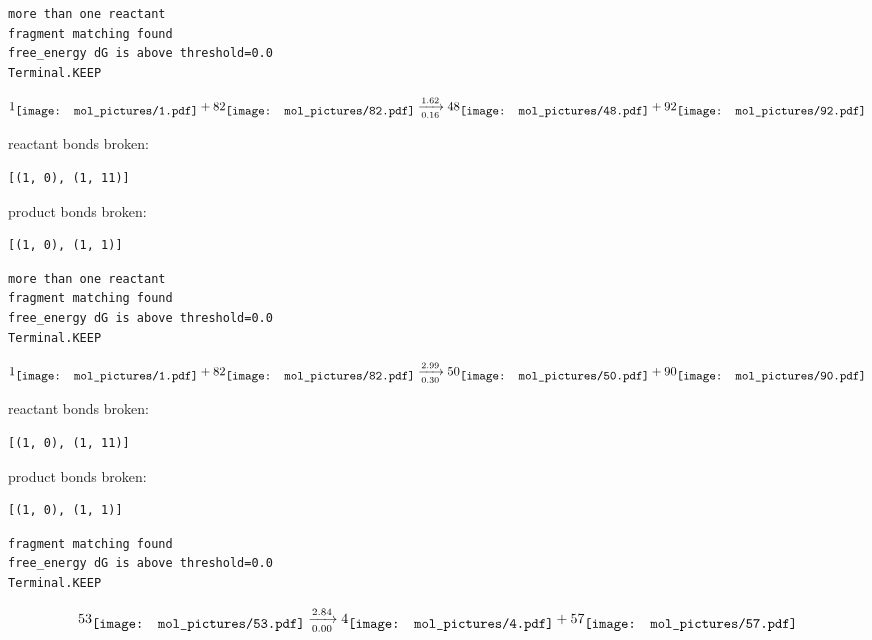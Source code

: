 \documentclass{article}
\begin{document}
\vspace{1cm}
\begin{verbatim}
more than one reactant
fragment matching found
free_energy dG is above threshold=0.0
Terminal.KEEP
\end{verbatim}
$$
1
\raisebox{-.5\height}{\texttt{[image: mol\_pictures/1.pdf]}}
+
82
\raisebox{-.5\height}{\texttt{[image: mol\_pictures/82.pdf]}}
\xrightarrow[0.16]{1.62}
48
\raisebox{-.5\height}{\texttt{[image: mol\_pictures/48.pdf]}}
+
92
\raisebox{-.5\height}{\texttt{[image: mol\_pictures/92.pdf]}}
$$


reactant bonds broken:\begin{verbatim}
[(1, 0), (1, 11)]
\end{verbatim}
product bonds broken:\begin{verbatim}
[(1, 0), (1, 1)]
\end{verbatim}




\vspace{1cm}
\begin{verbatim}
more than one reactant
fragment matching found
free_energy dG is above threshold=0.0
Terminal.KEEP
\end{verbatim}
$$
1
\raisebox{-.5\height}{\texttt{[image: mol\_pictures/1.pdf]}}
+
82
\raisebox{-.5\height}{\texttt{[image: mol\_pictures/82.pdf]}}
\xrightarrow[0.30]{2.99}
50
\raisebox{-.5\height}{\texttt{[image: mol\_pictures/50.pdf]}}
+
90
\raisebox{-.5\height}{\texttt{[image: mol\_pictures/90.pdf]}}
$$


reactant bonds broken:\begin{verbatim}
[(1, 0), (1, 11)]
\end{verbatim}
product bonds broken:\begin{verbatim}
[(1, 0), (1, 1)]
\end{verbatim}




\vspace{1cm}
\begin{verbatim}
fragment matching found
free_energy dG is above threshold=0.0
Terminal.KEEP
\end{verbatim}
$$
53
\raisebox{-.5\height}{\texttt{[image: mol\_pictures/53.pdf]}}
\xrightarrow[0.00]{2.84}
4
\raisebox{-.5\height}{\texttt{[image: mol\_pictures/4.pdf]}}
+
57
\raisebox{-.5\height}{\texttt{[image: mol\_pictures/57.pdf]}}
$$
\end{document}
